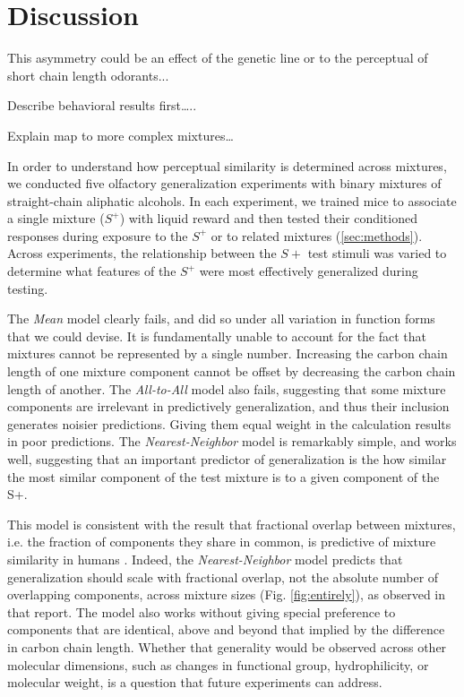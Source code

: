 \section*{Discussion}
\label{sec:discussion}

This asymmetry could be an effect of the genetic line or to the perceptual of short chain length odorants...

Describe behavioral results first…..

Explain map to more complex mixtures…

In order to understand how perceptual similarity is determined across mixtures, we conducted five olfactory generalization experiments with binary mixtures of straight-chain aliphatic alcohols.  
In each experiment, we trained mice to associate a single mixture ($S^+$) with liquid reward and then tested their conditioned responses during exposure to the $S^+$ or to related mixtures (\ref{sec:methods}).  
Across experiments, the relationship between the $S+$ test stimuli was varied to determine what features of the $S^+$ were most effectively generalized during testing.  

The \textit{Mean} model clearly fails, and did so under all variation in function forms that we could devise.  It is fundamentally unable to account for the fact that mixtures cannot be represented by a single number.  Increasing the carbon chain length of one mixture component cannot be offset by decreasing the carbon chain length of another.  The \textit{All-to-All} model also fails, suggesting that some mixture components are irrelevant in predictively generalization, and thus their inclusion generates noisier predictions.  Giving them equal weight in the calculation results in poor predictions.  The \textit{Nearest-Neighbor} model is remarkably simple, and works well, suggesting that an important predictor of generalization is the how similar the most similar component of the test mixture is to a given component of the S+.  

This model is consistent with the result that fractional overlap between mixtures, i.e. the fraction of components they share in common, is predictive of mixture similarity in humans \cite{24653035}.  Indeed, the \textit{Nearest-Neighbor} model predicts that generalization should scale with fractional overlap, not the absolute number of overlapping components, across mixture sizes (Fig. \ref{fig:entirely}), as observed in that report.  The model also works without giving special preference to components that are identical, above and beyond that implied by the difference in carbon chain length.  Whether that generality would be observed across other molecular dimensions, such as changes in functional group, hydrophilicity, or molecular weight, is a question that future experiments can address.  

